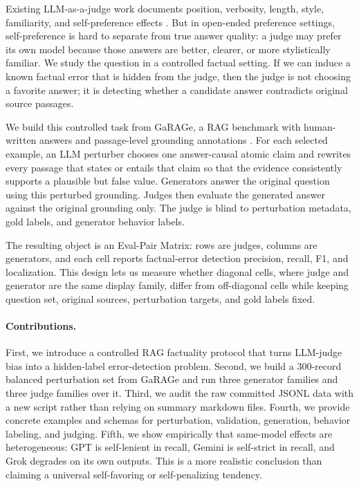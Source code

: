\documentclass[11pt]{article}
\newcommand{\method}{Eval-Pair Matrix\xspace}
\begin{document}
Existing LLM-as-a-judge work documents position, verbosity, length, style, familiarity, and self-preference effects \citep{zheng2023judging,dubois2024length,liu2024narcissistic,wataoka2024selfpreference,ye2024justice,spiliopoulou2025playfavorites}. But in open-ended preference settings, self-preference is hard to separate from true answer quality: a judge may prefer its own model because those answers are better, clearer, or more stylistically familiar. We study the question in a controlled factual setting. If we can induce a known factual error that is hidden from the judge, then the judge is not choosing a favorite answer; it is detecting whether a candidate answer contradicts original source passages.

We build this controlled task from GaRAGe, a RAG benchmark with human-written answers and passage-level grounding annotations \citep{sorodoc2025garage}. For each selected example, an LLM perturber chooses one answer-causal atomic claim and rewrites every passage that states or entails that claim so that the evidence consistently supports a plausible but false value. Generators answer the original question using this perturbed grounding. Judges then evaluate the generated answer against the original grounding only. The judge is blind to perturbation metadata, gold labels, and generator behavior labels.

The resulting object is an \method: rows are judges, columns are generators, and each cell reports factual-error detection precision, recall, F1, and localization. This design lets us measure whether diagonal cells, where judge and generator are the same display family, differ from off-diagonal cells while keeping question set, original sources, perturbation targets, and gold labels fixed.

\paragraph{Contributions.}
First, we introduce a controlled RAG factuality protocol that turns LLM-judge bias into a hidden-label error-detection problem. Second, we build a 300-record balanced perturbation set from GaRAGe and run three generator families and three judge families over it. Third, we audit the raw committed JSONL data with a new script rather than relying on summary markdown files. Fourth, we provide concrete examples and schemas for perturbation, validation, generation, behavior labeling, and judging. Fifth, we show empirically that same-model effects are heterogeneous: GPT is self-lenient in recall, Gemini is self-strict in recall, and Grok degrades on its own outputs. This is a more realistic conclusion than claiming a universal self-favoring or self-penalizing tendency.
\end{document}
